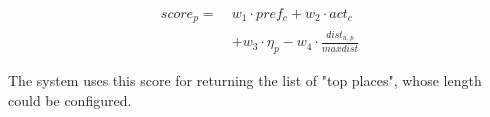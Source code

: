 
\begin{equation} \label{eq:score}
    \begin{split}
score_p =   \ &w_1 \cdot pref_c + w_2 \cdot act_c \\
                                        &+ w_3 \cdot \eta_p - w_4 \cdot \frac{dist_{u,p}}{maxdist}
    \end{split}
\end{equation}

The system uses this score for returning the list of "top places", whose length could be configured.




